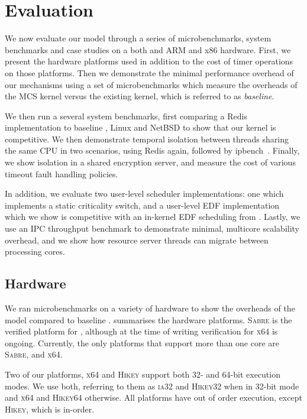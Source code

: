 \chapter{Evaluation}
\label{chap:evaluation}

We now evaluate our model through a series of microbenchmarks, system benchmarks and case studies on
a both and ARM and x86 hardware.
First, we present the hardware platforms used in addition to the cost of timer operations on those
platforms. Then we demonstrate the minimal performance overhead of our mechanisms using a set of 
microbenchmarks which measure the overheads of the MCS kernel versus the existing \selfour kernel, 
which is referred to as \emph{baseline}.  

We then run a several system benchmarks, first comparing a Redis~\citep{redis:url} 
implementation to baseline \selfour, Linux and NetBSD to show that our kernel is competitive.
We then demonstrate temporal
isolation between threads sharing the same CPU in two scenarios,
using Redis again, followed by ipbench~\citep{Wienand_Macpherson_04}. Finally, we show isolation in a
shared encryption server, and measure the cost of various timeout fault handling policies. 

In addition, we evaluate two user-level scheduler implementations: one which implements a static
criticality switch, and a user-level \gls{EDF} implementation which we show is
competitive with an in-kernel \gls{EDF} scheduling from \litmus. Lastly, we use an \gls{IPC}
throughput benchmark to demonstrate minimal, multicore scalability overhead, and we show 
how resource server threads can migrate between processing cores.

\section{Hardware}

We ran microbenchmarks on a variety of hardware to show the overheads of the model compared to
baseline \selfour.  summarises the hardware platforms. \textsc{Sabre} is
the verified platform for \selfour, although at the time of writing verification for \textsc{x64} is
ongoing. Currently, the only platforms that support more than one core are \textsc{Sabre},
and \textsc{x64}.

Two of our platforms, \textsc{x64} and \textsc{Hikey} support both 32- and 64-bit execution modes.
We use both, referring to them as \textsc{ia32} and \textsc{Hikey32} when in 32-bit mode and
\textsc{x64} and \textsc{Hikey64} otherwise. All platforms have out of order execution, except
\textsc{Hikey}, which is in-order.

